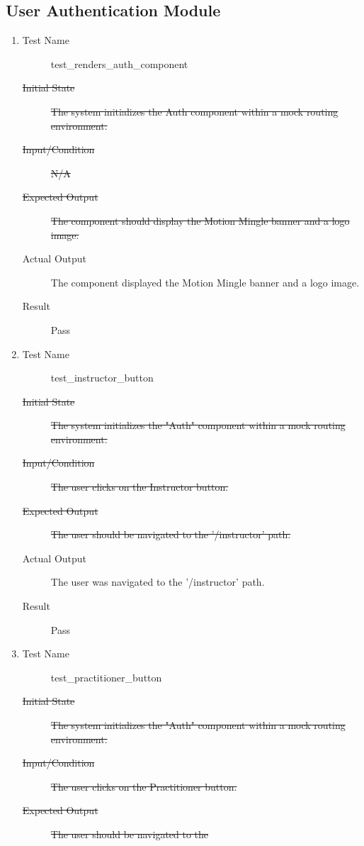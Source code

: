 \documentclass[12pt, titlepage]{article}
\begin{document}
\subsection{User Authentication Module}
\begin{enumerate}[UT-UA1]
\item \label{UT-UA1}
  \begin{description}
  \item[Test Name] test\_renders\_auth\_component
  \item[\sout{Initial State}] \sout{The system initializes the Auth component
      within a mock routing environment.}
  \item[\sout{Input/Condition}] \sout{N/A}
  \item[\sout{Expected Output}] \sout{The component should display the Motion
      Mingle banner and a logo image.}
  \item[Actual Output] The component displayed the Motion Mingle banner and a
    logo image.
  \item[Result] Pass
  \end{description}
\item \label{UT-UA2}
  \begin{description}
  \item[Test Name] test\_instructor\_button
  \item[\sout{Initial State}] \sout{The system initializes the "Auth" component
      within a mock routing environment.}
  \item[\sout{Input/Condition}] \sout{The user clicks on the Instructor button.}
  \item[\sout{Expected Output}] \sout{The user should be navigated to the
      '/instructor' path.}
  \item[Actual Output] The user was navigated to the '/instructor' path.
  \item[Result] Pass
  \end{description}
\item \label{UT-UA3}
  \begin{description}
  \item[Test Name] test\_practitioner\_button
  \item[\sout{Initial State}] \sout{The system initializes the "Auth" component
      within a mock routing environment.}
  \item[\sout{Input/Condition}] \sout{The user clicks on the Practitioner button.}
  \item[\sout{Expected Output}] \sout{The user should be navigated to the
}
\end{description}
\end{enumerate}
\end{document}
